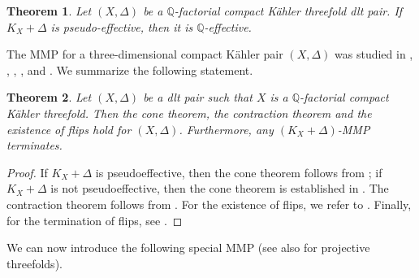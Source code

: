 \documentclass[12pt]{amsart}
\newcommand{\mbQ}{\mathbb{Q}}
\newcommand{\<}{\leq}
\newcommand{\D}{\Delta}
\newtheorem{theorem}{Theorem}[section]
\theoremstyle{remark}
\theoremstyle{definition}
\theoremstyle{definition}
\numberwithin{equation}{section}
\theoremstyle{definition}
\theoremstyle{definition}
\begin{document}
 \begin{theorem}
 \label{thm-non-vanishing-general-setting}
 Let $(X, \Delta)$ be a $\mbQ$-factorial compact K\"ahler threefold dlt pair. 
 If $K_X+\D$ is pseudo-effective, then it is $\mathbb{Q}$-effective.
 \end{theorem}



The   MMP for a three-dimensional compact K\"ahler  pair $(X, \D)$  was studied in \cite{HP16}, \cite{HP15}, \cite{CHP16}, \cite{DasOu2022},  \cite{DasHacon2020} and \cite{DHP22}. 
We summarize the following statement.  

\begin{theorem}
\label{thm:existence-dlt-MMP}
    Let $(X,\D)$ be a dlt pair such that $X$ is a $\mathbb{Q}$-factorial  compact K\"ahler threefold.  
    Then the cone theorem, the contraction theorem and the existence of flips  hold for $(X,\D)$. 
    Furthermore,  any $(K_X+\D)$-MMP   terminates. 
\end{theorem}

\begin{proof}
If $K_X+\D$ is pseudoeffective, then 
the cone theorem follows from \cite[Theorem 10.12]{DasOu2022}; 
if $K_X+\D$ is not pseudoeffective, then 
the cone theorem is established in \cite[Theorem 5.2]{DHP22}.   
The contraction theorem follows from \cite[Corollary 5.3 and Corollary 5.6]{DHP22}.  
For the existence of flips, we refer to \cite[Theorem 4.3]{CHP16}. 
Finally, for the termination of   flips, see \cite[Theorem 3.3]{DasOu2022}. 
\end{proof}


 



We can now introduce the following special MMP (see also \cite[Lemma 5.1]{KMM94} for projective threefolds). 
\end{document}
